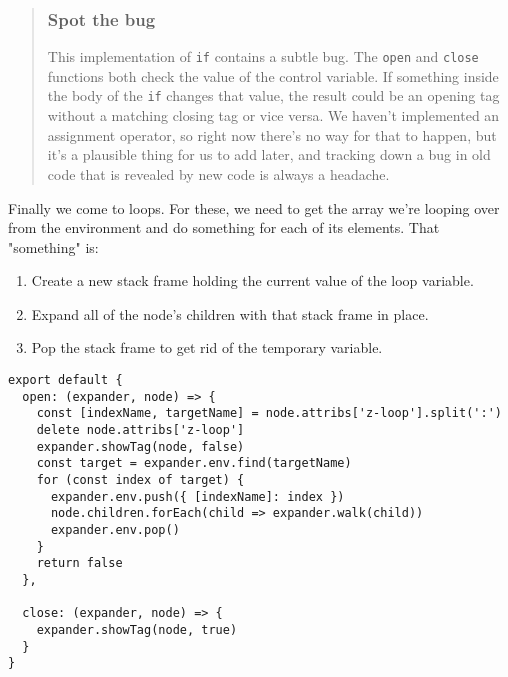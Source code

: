 \documentclass[krantzl]{krantz}
\newenvironment{callout}{\savenotes\begin{tBox}\begin{quotation}\toggletrue{inbox}\renewcommand{\thempfootnote}{\arabic{footnote}}}{\end{quotation}\vspace{\baselineskip}\end{tBox}\togglefalse{inbox}\spewnotes}
\begin{document}
\begin{callout}


\subsubsection*{Spot the bug}


This implementation of \texttt{if} contains a subtle bug.
The \texttt{open} and \texttt{close} functions both check the value of the control variable.
If something inside the body of the \texttt{if} changes that value,
the result could be an opening tag without a matching closing tag or vice versa.
We haven't implemented an assignment operator,
so right now there's no way for that to happen,
but it's a plausible thing for us to add later,
and tracking down a bug in old code that is revealed by new code
is always a headache.

\end{callout}


Finally we come to loops.
For these,
we need to get the array we're looping over from the environment
and do something for each of its elements.
That "something" is:

\begin{enumerate}

\item 

Create a new stack frame holding the current value of the loop variable.



\item 

Expand all of the node's children with that stack frame in place.



\item 

Pop the stack frame to get rid of the temporary variable.



\end{enumerate}


\begin{lstlisting}[frame=single,frameround=tttt]
export default {
  open: (expander, node) => {
    const [indexName, targetName] = node.attribs['z-loop'].split(':')
    delete node.attribs['z-loop']
    expander.showTag(node, false)
    const target = expander.env.find(targetName)
    for (const index of target) {
      expander.env.push({ [indexName]: index })
      node.children.forEach(child => expander.walk(child))
      expander.env.pop()
    }
    return false
  },

  close: (expander, node) => {
    expander.showTag(node, true)
  }
}
\end{lstlisting}
\end{document}
